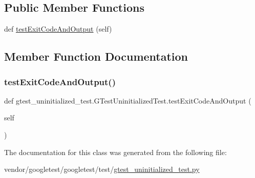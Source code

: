 \subsection*{Public Member Functions}
\begin{DoxyCompactItemize}
\item 
def \hyperlink{classgtest__uninitialized__test_1_1_g_test_uninitialized_test_ace4bbad0abec476b03a91bb453e6451c}{test\+Exit\+Code\+And\+Output} (self)
\end{DoxyCompactItemize}


\subsection{Member Function Documentation}
\mbox{\label{classgtest__uninitialized__test_1_1_g_test_uninitialized_test_ace4bbad0abec476b03a91bb453e6451c}} 
\subsubsection{\texorpdfstring{test\+Exit\+Code\+And\+Output()}{testExitCodeAndOutput()}}
{\footnotesize\ttfamily def gtest\+\_\+uninitialized\+\_\+test.\+G\+Test\+Uninitialized\+Test.\+test\+Exit\+Code\+And\+Output (\begin{DoxyParamCaption}\item[{}]{self }\end{DoxyParamCaption})}



The documentation for this class was generated from the following file\+:\begin{DoxyCompactItemize}
\item 
vendor/googletest/googletest/test/\hyperlink{gtest__uninitialized__test_8py}{gtest\+\_\+uninitialized\+\_\+test.\+py}\end{DoxyCompactItemize}
